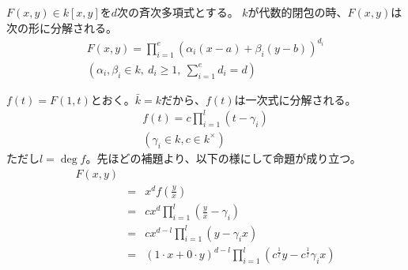 \documentclass[a4]{article}
\begin{document}
        \begin{Prop}
            $F(x, y) \in k[x,y]$を$d$次の斉次多項式とする。
            $k$が代数的閉包の時、$F(x, y)$は次の形に分解される。
            \begin{gather*}
                F(x, y)=\prod^{e}_{i=1} (\alpha_{i}(x-a)+\beta_{i}(y-b))^{d_{i}} \\
                ( \alpha_{i},\beta_{i} \in k,~ d_i \geq 1,~ \sum^e_{i=1}{d_i}=d )
            \end{gather*}
        \end{Prop}
        \begin{Proof}
            $f(t)=F(1, t)$とおく。$\bar{k}=k$だから、$f(t)$は一次式に分解される。
            \begin{gather*}
                f(t) = c \prod_{i=1}^{l}{(t-\gamma_{i})} \\
                (\gamma_{i} \in k, c \in k^{\times})
            \end{gather*}
            ただし$l=\deg f$。先ほどの補題より、以下の様にして命題が成り立つ。
            \begin{eqnarray*}
                F(x, y) \\
                &=& x^{d} f\left( \frac{y}{x} \right) \\
                &=& c x^{d} \prod_{i=1}^{l}{ \left( \frac{y}{x} - \gamma_{i} \right)} \\
                &=& c x^{d-l} \prod_{i=1}^{l}{ \left( y - \gamma_{i}x \right)} \\
                &=& (1 \cdot x + 0 \cdot y)^{d-l} \prod_{i=1}^{l}{ \left( c^{\frac{1}{l}}y - c^{\frac{1}{l}}\gamma_{i}x \right)} \\
            \end{eqnarray*}
            \QED
        \end{Proof}
\end{document}
